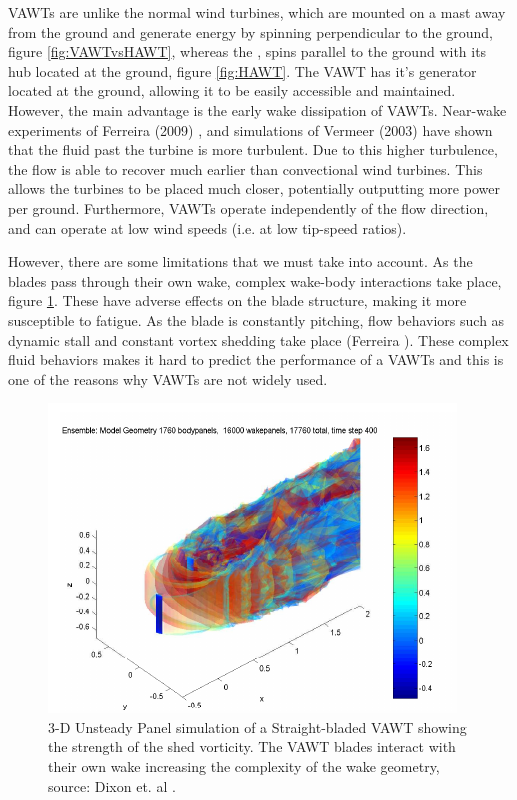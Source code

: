 VAWTs are unlike the normal wind turbines, which are mounted on a mast away from the ground and generate energy by spinning perpendicular to the ground, figure \ref{fig:VAWTvsHAWT}, whereas the , spins parallel to the ground with its hub located at the ground, figure \ref{fig:HAWT}. The VAWT has it's generator located at the ground, allowing it to be easily accessible and maintained. However, the main advantage is the early wake dissipation of VAWTs. Near-wake experiments of Ferreira (2009) \cite{SimaoFerreira2009}, and simulations of Vermeer (2003) \cite{Vermeer2003a} have shown that the fluid past the turbine is more turbulent. Due to this higher turbulence, the flow is able to recover much earlier than convectional wind turbines. This allows the turbines to be placed much closer, potentially outputting more power per ground. Furthermore, VAWTs operate independently of the flow direction, and can operate at low wind speeds (i.e. at low tip-speed ratios).

However, there are some limitations that we must take into account. As the blades pass through their own wake, complex wake-body interactions take place, figure \ref{fig:3DunsteadyPanelVAWT}. These have adverse effects on the blade structure, making it more susceptible to fatigue. As the blade is constantly pitching, flow behaviors such as dynamic stall and constant vortex shedding take place (Ferreira \cite{SimaoFerreira2008a}). These complex fluid behaviors makes it hard to predict the performance of a VAWTs and this is one of the reasons why VAWTs are not widely used. 

	\begin{figure}[!t]
		\centering
		\includegraphics[width=0.6\linewidth]{figures/introduction/3DunsteadyPanelVAWT.png}
		\caption{3-D Unsteady Panel simulation of a Straight-bladed VAWT showing the strength of the shed vorticity. The VAWT blades interact with their own wake increasing the complexity of the wake geometry, source: Dixon et. al \cite{Dixon2008}.}
		\label{fig:3DunsteadyPanelVAWT}
	\end{figure}

